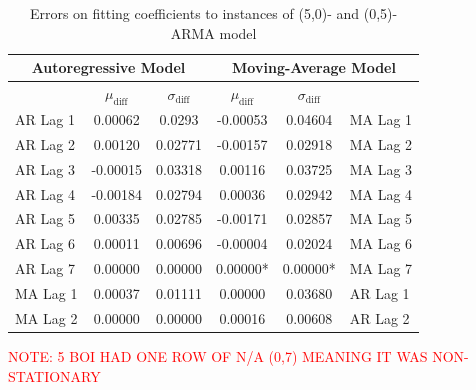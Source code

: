 \documentclass[oneside,12pt,openany]{book}
\begin{document}
     \begin{table}[hbt!]
        \centering
        \begin{tabular}{|l|c|c|c|c|l|}
            \hline
            \multicolumn{3}{|c|}{Autoregressive Model} & \multicolumn{3}{c|}{Moving-Average Model} \\ \hline
            \cellcolor{black} & $\mu_{\text{diff}}$ & $\sigma_{\text{diff}}$ & $\mu_{\text{diff}}$ & $\sigma_{\text{diff}}$ &  \cellcolor{black} \\ \hline
            AR Lag 1 & 0.00062 & 0.0293 & -0.00053 & 0.04604 & MA Lag 1 \\ \hline
            AR Lag 2 & 0.00120 & 0.02771 & -0.00157 & 0.02918 & MA Lag 2 \\ \hline
            AR Lag 3 & -0.00015 & 0.03318 & 0.00116 & 0.03725 & MA Lag 3 \\ \hline
            AR Lag 4 & -0.00184 & 0.02794 & 0.00036 & 0.02942 & MA Lag 4 \\ \hline
            AR Lag 5 & 0.00335 & 0.02785 & -0.00171 & 0.02857 & MA Lag 5 \\ \hline
            AR Lag 6 & 0.00011 & 0.00696 & -0.00004 & 0.02024 & MA Lag 6 \\ \hline
            AR Lag 7 & 0.00000 & 0.00000 & 0.00000* & 0.00000* & MA Lag 7 \\ \hline
            MA Lag 1 & 0.00037 & 0.01111 & 0.00000 & 0.03680 & AR Lag 1 \\ \hline
            MA Lag 2 & 0.00000 & 0.00000 & 0.00016 & 0.00608 & AR Lag 2 \\ \hline
        \end{tabular}
        \caption{Errors on fitting coefficients to instances of (5,0)- and (0,5)-ARMA model}
        \label{tab:errortsfitting5}
    \end{table}

    \textcolor{red}{NOTE: 5 BOI HAD ONE ROW OF N/A (0,7) MEANING IT WAS NON-STATIONARY}
    
\end{document}
